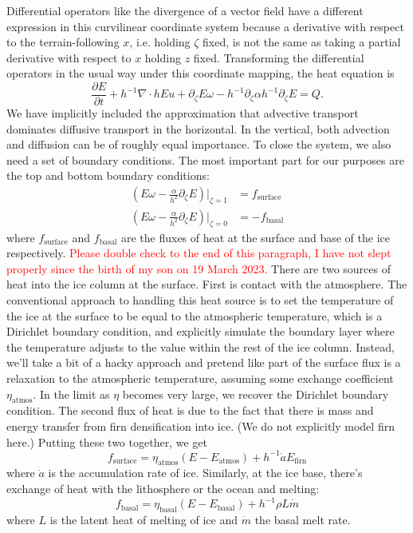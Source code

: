 \documentclass{article}
\theoremstyle{definition}
\theoremstyle{plain}
\begin{document}
Differential operators like the divergence of a vector field have a different expression in this curvilinear coordinate system because a derivative with respect to the terrain-following $x$, i.e. holding $\zeta$ fixed, is not the same as taking a partial derivative with respect to $x$ holding $z$ fixed.
Transforming the differential operators in the usual way under this coordinate mapping, the heat equation is
\begin{equation}
    \frac{\partial E}{\partial t} + h^{-1}\nabla\cdot hEu + \partial_\zeta E\omega - h^{-1}\partial_\zeta\alpha h^{-1}\partial_\zeta E = Q.
    \label{eq:differential-heat-equation-3d}
\end{equation}
We have implicitly included the approximation that advective transport dominates diffusive transport in the horizontal.
In the vertical, both advection and diffusion can be of roughly equal importance.
To close the system, we also need a set of boundary conditions.
The most important part for our purposes are the top and bottom boundary conditions:
\begin{align}
    \left(E\omega - \frac{\alpha}{h^2}\partial_\zeta E\right)|_{\zeta = 1} & = f_{\text{surface}} \\
    \left(E\omega - \frac{\alpha}{h^2}\partial_\zeta E\right)|_{\zeta = 0} & = -f_{\text{basal}}
\end{align}
where $f_{\text{surface}}$ and $f_{\text{basal}}$ are the fluxes of heat at the surface and base of the ice respectively.
\textcolor{red}{Please double check to the end of this paragraph, I have not slept properly since the birth of my son on 19 March 2023.}
There are two sources of heat into the ice column at the surface.
First is contact with the atmosphere.
The conventional approach to handling this heat source is to set the temperature of the ice at the surface to be equal to the atmospheric temperature, which is a Dirichlet boundary condition, and explicitly simulate the boundary layer where the temperature adjusts to the value within the rest of the ice column.
Instead, we'll take a bit of a hacky approach and pretend like part of the surface flux is a relaxation to the atmospheric temperature, assuming some exchange coefficient $\eta_{\text{atmos}}$.
In the limit as $\eta$ becomes very large, we recover the Dirichlet boundary condition.
The second flux of heat is due to the fact that there is mass and energy transfer from firn densification into ice.
(We do not explicitly model firn here.)
Putting these two together, we get
\begin{equation}
    f_{\text{surface}} = \eta_{\text{atmos}}(E - E_{\text{atmos}}) +  h^{-1}\dot a E_{\text{firn}}
    \label{eq:f-surface}
\end{equation}
where $\dot a$ is the accumulation rate of ice.
Similarly, at the ice base, there's exchange of heat with the lithosphere or the ocean and melting:
\begin{equation}
    f_{\text{basal}} = \eta_{\text{basal}}(E - E_{\text{basal}}) + h^{-1}\rho L\dot m
    \label{eq:f-basal}
\end{equation}
where $L$ is the latent heat of melting of ice and $\dot m$ the basal melt rate.
\end{document}
